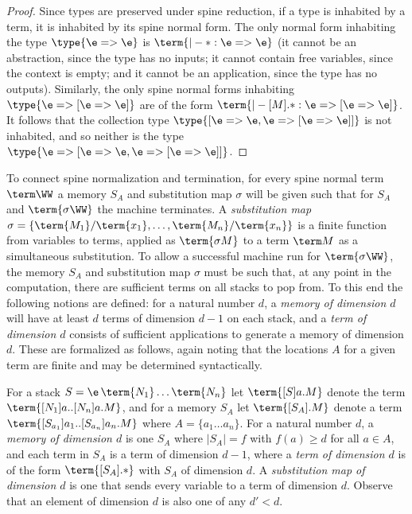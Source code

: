 \documentclass[a4paper,UKenglish,cleveref, autoref, thm-restate]{lipics-v2021}
\begin{document}
\begin{proof}
Since types are preserved under spine reduction, if a type is inhabited by a term, it is inhabited by its spine normal form. The only normal form inhabiting the type $\type{\e=>\e}$ is $\term{|- * : \e=>\e}$ (it cannot be an abstraction, since the type has no inputs; it cannot contain free variables, since the context is empty; and it cannot be an application, since the type has no outputs). Similarly, the only spine normal forms inhabiting $\type{\e => [\e=>\e]}$ are of the form $\term{|- [M].* : \e => [\e =>\e ]}$. It follows that the collection type $\type{[ \e=>\e , \e => [\e=>\e] ]}$ is not inhabited, and so neither is the type $\type{\e => [ \e=>\e , \e => [\e=>\e] ]}$.
\end{proof}

To connect spine normalization and termination, for every spine normal term $\term\WW$ a memory $S_A$ and substitution map $\sigma$ will be given such that for $S_A$ and $\term{\sigma\WW}$ the machine terminates. A \emph{substitution map} $\sigma=\{\term{M_1}/\term{x_1},\dots,\term{M_n}/\term{x_n}\}$ is a finite function from variables to terms, applied as $\term{\sigma M}$ to a term $\term M$ as a simultaneous substitution. To allow a successful machine run for $\term{\sigma\WW}$, the memory $S_A$ and substitution map $\sigma$ must be such that, at any point in the computation, there are sufficient terms on all stacks to pop from. To this end the following notions are defined: for a natural number $d$, a \emph{memory of dimension $d$} will have at least $d$ terms of dimension $d-1$ on each stack, and a \emph{term of dimension $d$} consists of sufficient applications to generate a memory of dimension $d$. These are formalized as follows, again noting that the locations $A$ for a given term are finite and may be determined syntactically.

For a stack $S=\e\,\term{N_1}\dots\term{N_n}$ let $\term{[S]a.M}$ denote the term $\term{[N_1]a..[N_n]a.M}$, and for a memory $S_A$ let $\term{[S_A].M}$ denote a term $\term{[S_{a_1}]a_1..[S_{a_n}]a_n.M}$ where $A=\{a_1\dots a_n\}$. For a natural number $d$, a \emph{memory of dimension $d$} is one $S_A$ where $|S_A|=f$ with $f(a)\geq d$ for all $a\in A$, and each term in $S_A$ is a term of dimension $d-1$, where a \emph{term of dimension $d$} is of the form $\term{[S_A].*}$ with $S_A$ of dimension $d$. A \emph{substitution map of dimension $d$} is one that sends every variable to a term of dimension $d$. Observe that an element of dimension $d$ is also one of any $d'< d$.
\end{document}
